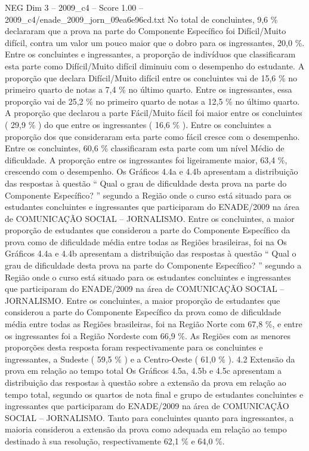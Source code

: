 \begin{textsample}{NEG Dim 3 – 2009\_c4 – Score 1.00 – 2009\_c4/enade\_2009\_jorn\_09ea6e96cd.txt}
No total de concluintes, 9,6 \% declararam que a prova na parte do Componente Específico foi Difícil/Muito difícil, contra um valor um pouco maior que o dobro para os ingressantes, 20,0 \%.
Entre os concluintes e ingressantes, a proporção de indivíduos que classificaram esta parte como Difícil/Muito difícil diminuiu com o desempenho do estudante.
A proporção que declara Difícil/Muito difícil entre os concluintes vai de 15,6 \% no primeiro quarto de notas a 7,4 \% no último quarto.
Entre os ingressantes, essa proporção vai de 25,2 \% no primeiro quarto de notas a 12,5 \% no último quarto.
A proporção que declarou a parte Fácil/Muito fácil foi maior entre os concluintes ( 29,9 \% ) do que entre os ingressantes ( 16,6 \% ).
Entre os concluintes a proporção dos que consideraram esta parte como fácil cresce com o desempenho.
Entre os concluintes, 60,6 \% classificaram esta parte com um nível Médio de dificuldade.
A proporção entre os ingressantes foi ligeiramente maior, 63,4 \%, crescendo com o desempenho.
Os Gráficos 4.4a e 4.4b apresentam a distribuição das respostas à questão “ Qual o grau de dificuldade desta prova na parte do Componente Específico? ” segundo a Região onde o curso está situado para os estudantes concluintes e ingressantes que participaram do ENADE/2009 na área de COMUNICAÇÃO SOCIAL – JORNALISMO.
Entre os concluintes, a maior proporção de estudantes que considerou a parte do Componente Específico da prova como de dificuldade média entre todas as Regiões brasileiras, foi na Os Gráficos 4.4a e 4.4b apresentam a distribuição das respostas à questão “ Qual o grau de dificuldade desta prova na parte do Componente Específico? ” segundo a Região onde o curso está situado para os estudantes concluintes e ingressantes que participaram do ENADE/2009 na área de COMUNICAÇÃO SOCIAL – JORNALISMO.
Entre os concluintes, a maior proporção de estudantes que considerou a parte do Componente Específico da prova como de dificuldade média entre todas as Regiões brasileiras, foi na Região Norte com 67,8 \%, e entre os ingressantes foi a Região Nordeste com 66,9 \%.
As Regiões com as menores proporções desta resposta foram respectivamente para os concluintes e ingressantes, a Sudeste ( 59,5 \% ) e a Centro-Oeste ( 61,0 \% ). 4.2 Extensão da prova em relação ao tempo total Os Gráficos 4.5a, 4.5b e 4.5c apresentam a distribuição das respostas à questão sobre a extensão da prova em relação ao tempo total, segundo os quartos de nota final e grupo de estudantes concluintes e ingressantes que participaram do ENADE/2009 na área de COMUNICAÇÃO SOCIAL – JORNALISMO.
Tanto para concluintes quanto para ingressantes, a maioria considerou a extensão da prova como adequada em relação ao tempo destinado à sua resolução, respectivamente 62,1 \% e 64,0 \%.

\end{textsample}
